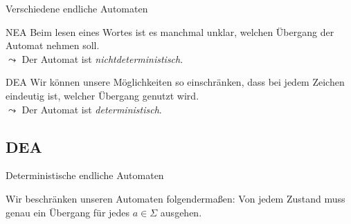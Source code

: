 \begin{frame}[fragile]{Verschiedene endliche Automaten}
\begin{alertblock}{NEA}
Beim lesen eines Wortes ist es manchmal unklar, welchen Übergang der Automat nehmen soll.\\
$\leadsto$ Der Automat ist \emph{\alert{nichtdeterministisch}}.
\end{alertblock}
\begin{alertblock}{DEA}
Wir können unsere Möglichkeiten so einschränken, dass bei jedem Zeichen eindeutig ist, welcher Übergang genutzt wird.\\
$\leadsto$ Der Automat ist \alert{\emph{deterministisch}}.
\end{alertblock}
\end{frame}

\subsection{DEA}
\begin{frame}[fragile]{Deterministische endliche Automaten}
\begin{alertblock}{Wir beschränken unseren Automaten folgendermaßen:}
Von \alert{jedem Zustand} muss \alert{genau ein} Übergang für \alert{jedes $a\in\Sigma$} ausgehen.
\end{alertblock}
\end{frame}

